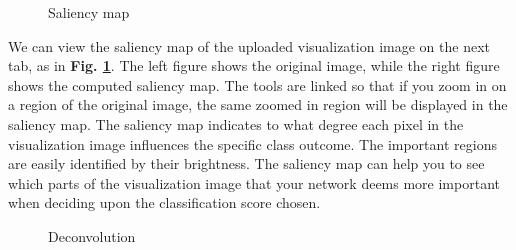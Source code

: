 
\begin{figure}[h!]
    \centering
        \caption{Saliency map}
        \label{saliency-tab}
\end{figure}

\noindent We can view the saliency map of the uploaded visualization image on the next tab, as in \textbf{Fig. \ref{saliency-tab}}. The left figure shows the original image, while the right figure shows the computed saliency map. The tools are linked so that if you zoom in on a region of the original image, the same zoomed in region will be displayed in the saliency map. The saliency map indicates to what degree each pixel in the visualization image influences the specific class outcome. The important regions are easily identified by their brightness. The saliency map can help you to see which parts of the visualization image that your network deems more important when deciding upon the classification score chosen.  \\


\begin{figure}[h!]
    \centering
        \caption{Deconvolution}
        \label{deconv-tab}
\end{figure}

